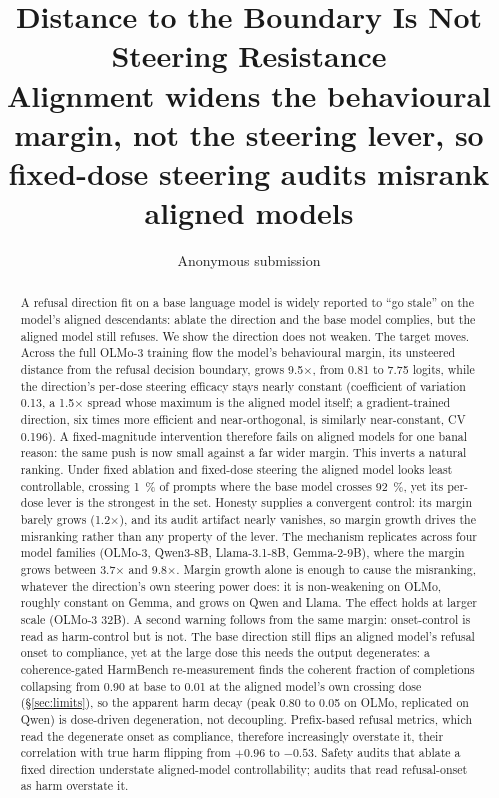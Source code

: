 \documentclass{article}
\title{\bfseries Distance to the Boundary Is Not Steering Resistance\\[2pt]
\large Alignment widens the behavioural margin, not the steering lever, so
fixed-dose steering audits misrank aligned models}
\author{Anonymous submission}
\date{}
\newcommand{\x}{$\times$}
\begin{document}
\maketitle

\begin{abstract}
A refusal direction fit on a base language model is widely reported to ``go stale'' on the
model's aligned descendants: ablate the direction and the base model complies, but the aligned
model still refuses. We show the direction does not weaken. The target moves. Across the full
OLMo-3 training flow the model's behavioural margin, its unsteered distance from the refusal
decision boundary, grows \num{9.5}\x, from \num{0.81} to \num{7.75} logits, while the direction's
per-dose steering efficacy stays nearly constant (coefficient of variation \num{0.13}, a \num{1.5}\x{} spread whose maximum is the aligned model itself; a
gradient-trained direction, six times more efficient and near-orthogonal, is similarly near-constant, CV \num{0.196}). A fixed-magnitude intervention therefore fails on aligned models for one banal reason:
the same push is now small against a far wider margin. This inverts a natural ranking. Under fixed
ablation and fixed-dose steering the aligned model looks least controllable, crossing \SI{1}{\percent}
of prompts where the base model crosses \SI{92}{\percent}, yet its per-dose lever is the strongest
in the set. Honesty supplies a convergent control: its margin barely grows (\num{1.2}\x), and its audit
artifact nearly vanishes, so margin growth drives the misranking rather than any property of the
lever. The mechanism replicates across four model families (OLMo-3, Qwen3-8B, Llama-3.1-8B,
Gemma-2-9B), where the margin grows between \num{3.7}\x{} and \num{9.8}\x. Margin growth alone is
enough to cause the misranking, whatever the direction's own steering power does: it is non-weakening
on OLMo, roughly constant on Gemma, and grows on Qwen and Llama. The effect holds at larger scale
(OLMo-3 32B). A second warning follows from the same margin: onset-control is read as harm-control
but is not. The base direction still flips an aligned model's refusal onset to compliance, yet at the
large dose this needs the output degenerates: a coherence-gated HarmBench re-measurement finds the
coherent fraction of completions collapsing from \num{0.90} at base to \num{0.01} at the aligned
model's own crossing dose (\S\ref{sec:limits}), so the apparent harm decay (peak \num{0.80} to
\num{0.05} on OLMo, replicated on Qwen) is dose-driven degeneration, not decoupling. Prefix-based
refusal metrics, which read the degenerate onset as compliance, therefore increasingly overstate it,
their correlation with true harm flipping from $+0.96$ to $-0.53$. Safety audits that ablate a fixed direction understate aligned-model
controllability; audits that read refusal-onset as harm overstate it.
\end{abstract}
\end{document}
